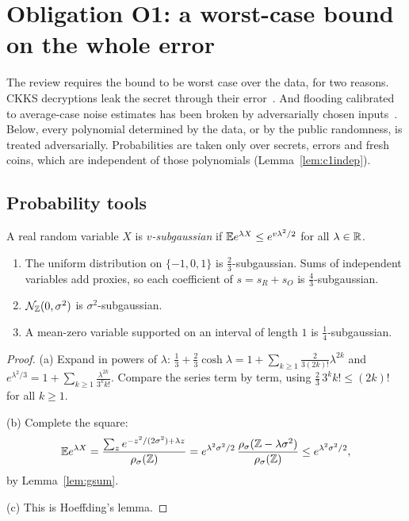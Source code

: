 \section{Obligation O1: a worst-case bound on the whole error}
\label{sec:err}

The review requires the bound to be worst case over the data, for two reasons. CKKS decryptions leak the secret through their error~\cite{LM21}. And flooding calibrated to average-case noise estimates has been broken by adversarially chosen inputs~\cite{GNSJ24}. Below, every polynomial determined by the data, or by the public randomness, is treated adversarially. Probabilities are taken only over secrets, errors and fresh coins, which are independent of those polynomials (Lemma~\ref{lem:c1indep}).

\subsection{Probability tools}

A real random variable $X$ is \emph{$v$-subgaussian} if $\mathbb{E} e^{\lambda X}\le e^{v\lambda^2/2}$ for all $\lambda\in\mathbb{R}$.

\begin{lemma}\label{lem:proxy}
\begin{enumerate}[nosep,label=(\alph*)]
  \item The uniform distribution on $\{-1,0,1\}$ is $\frac23$-subgaussian. Sums of independent variables add proxies, so each coefficient of $s=s_R+s_O$ is $\frac43$-subgaussian.
  \item $\mathcal{N}_{\mathbb{Z}}(0,\sigma^2)$ is $\sigma^2$-subgaussian.
  \item A mean-zero variable supported on an interval of length $1$ is $\frac14$-subgaussian.
\end{enumerate}
\end{lemma}
\begin{proof}
(a) Expand in powers of $\lambda$: $\frac13+\frac23\cosh\lambda=1+\sum_{k\ge1}\frac{2}{3(2k)!}\lambda^{2k}$ and $e^{\lambda^2/3}=1+\sum_{k\ge1}\frac{\lambda^{2k}}{3^kk!}$. Compare the series term by term, using $\frac23\,3^kk!\le(2k)!$ for all $k\ge1$.

(b) Complete the square:
\[
  \mathbb{E} e^{\lambda X}=\frac{\sum_z e^{-z^2/(2\sigma^2)+\lambda z}}{\rho_\sigma(\mathbb{Z})}=e^{\lambda^2\sigma^2/2}\,\frac{\rho_\sigma(\mathbb{Z}-\lambda\sigma^2)}{\rho_\sigma(\mathbb{Z})}\le e^{\lambda^2\sigma^2/2},
\]
by Lemma~\ref{lem:gsum}.

(c) This is Hoeffding's lemma.
\end{proof}

